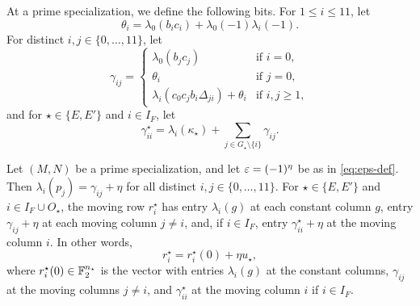At a prime specialization, we define the following bits. For $1\le i\le11$, let
\begin{equation}\label{eq:theta}
\theta_i=\lambda_0(b_ic_i)+\lambda_0(-1)\lambda_i(-1).
\end{equation}
For distinct $i,j\in\{0,\dots,11\}$, let
\begin{equation}\label{eq:gamma}
\gamma_{ij}=\begin{cases}
\lambda_0(b_jc_j)&\text{if }i=0,\\
\theta_i&\text{if }j=0,\\
\lambda_i(c_0c_jb_i\Delta_{ji})+\theta_i&\text{if }i,j\ge1,
\end{cases}
\end{equation}
and for $\star\in\{E,E'\}$ and $i\in I_F$, let
\begin{equation}\label{eq:gamma-diagonal}
\gamma^\star_{ii}=\lambda_i(\kappa_\star)+\sum_{j\in G_\star\setminus\{i\}}\gamma_{ij}.
\end{equation}

\begin{corollary}\label{cor:eta-structure}
Let $(M,N)$ be a prime specialization, and let $\varepsilon=(-1)^\eta$ be as in \eqref{eq:eps-def}. Then $\lambda_i(p_j)=\gamma_{ij}+\eta$ for all distinct $i,j\in\{0,\dots,11\}$. For $\star\in\{E,E'\}$ and $i\in I_F\cup O_\star$, the moving row $r^\star_i$ has entry $\lambda_i(g)$ at each constant column $g$, entry $\gamma_{ij}+\eta$ at each moving column $j\ne i$, and, if $i\in I_F$, entry $\gamma^\star_{ii}+\eta$ at the moving column $i$. In other words,
\begin{equation}\label{eq:eta-structure}
r^\star_i=r^\star_i(0)+\eta u_\star,
\end{equation}
where $r^\star_i(0)\in\mathbb F_2^{n_\star}$ is the vector with entries $\lambda_i(g)$ at the constant columns, $\gamma_{ij}$ at the moving columns $j\ne i$, and $\gamma^\star_{ii}$ at the moving column $i$ if $i\in I_F$.
\end{corollary}

